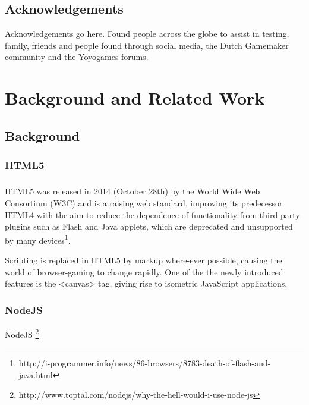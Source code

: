 \documentclass[bsc,frontabs,twoside,singlespacing,parskip,deptreport]{infthesis}     %
\begin{document}
\section*{Acknowledgements}
Acknowledgements go here. 
Found people across the globe to assist in testing, family, friends and people found through social media, the Dutch Gamemaker community and the Yoyogames forums.
\tableofcontents




\chapter{Background and Related Work}
\section{Background}
\subsection{HTML5}
\paragraph{}HTML5 was released in 2014 (October 28th) by the World Wide Web Consortium (W3C) and is a raising web standard, improving its predecessor HTML4 with the aim to reduce the dependence of functionality from third-party plugins such as Flash and Java applets, which are deprecated and unsupported by many devices\footnote{http://i-programmer.info/news/86-browsers/8783-death-of-flash-and-java.html}.

Scripting is replaced in HTML5 by markup where-ever possible, causing the world of browser-gaming to change rapidly. One of the the newly introduced features is the <canvas> tag, giving rise to isometric JavaScript applications.

\subsection{NodeJS}

NodeJS \footnote{http://www.toptal.com/nodejs/why-the-hell-would-i-use-node-js}
\end{document}
